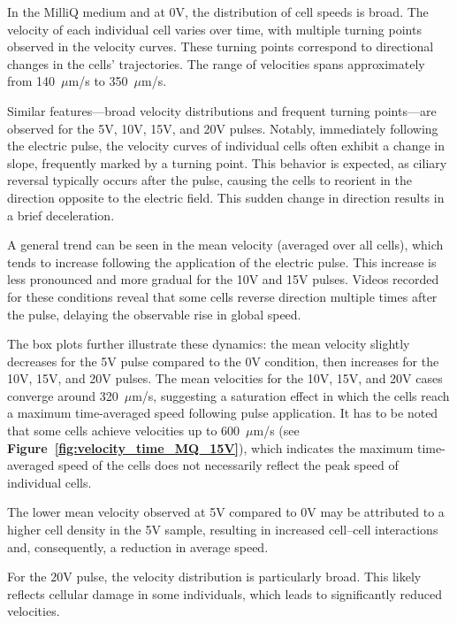 In the MilliQ medium and at 0V, the distribution of cell speeds is broad. The velocity of each individual cell varies over time, with multiple turning points observed in the velocity curves. These turning points correspond to directional changes in the cells’ trajectories. The range of velocities spans approximately from 140~$\mu$m/s to 350~$\mu$m/s.

Similar features—broad velocity distributions and frequent turning points—are observed for the 5V, 10V, 15V, and 20V pulses. Notably, immediately following the electric pulse, the velocity curves of individual cells often exhibit a change in slope, frequently marked by a turning point. This behavior is expected, as ciliary reversal typically occurs after the pulse, causing the cells to reorient in the direction opposite to the electric field. This sudden change in direction results in a brief deceleration.

A general trend can be seen in the mean velocity (averaged over all cells), which tends to increase following the application of the electric pulse. This increase is less pronounced and more gradual for the 10V and 15V pulses. Videos recorded for these conditions reveal that some cells reverse direction multiple times after the pulse, delaying the observable rise in global speed.

The box plots further illustrate these dynamics: the mean velocity slightly decreases for the 5V pulse compared to the 0V condition, then increases for the 10V, 15V, and 20V pulses. The mean velocities for the 10V, 15V, and 20V cases converge around 320~$\mu$m/s, suggesting a saturation effect in which the cells reach a maximum time-averaged speed following pulse application. It has to be noted that some cells achieve velocities up to 600~$\mu$m/s (see \textbf{Figure~\ref{fig:velocity_time_MQ_15V}}), which indicates the maximum time-averaged speed of the cells does not necessarily reflect the peak speed of individual cells.

The lower mean velocity observed at 5V compared to 0V may be attributed to a higher cell density in the 5V sample, resulting in increased cell–cell interactions and, consequently, a reduction in average speed.

For the 20V pulse, the velocity distribution is particularly broad. This likely reflects cellular damage in some individuals, which leads to significantly reduced velocities.


